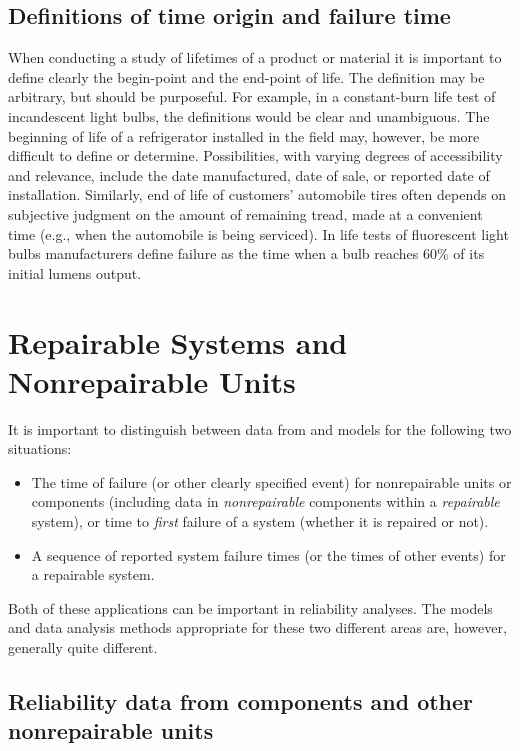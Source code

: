 \subsection{Definitions of time origin and failure time}
\label{section:def.of.time.origin}
When conducting a study of lifetimes of a product or material it is
important to define clearly the begin-point and the end-point of life.
The definition may be arbitrary, but should be purposeful.  For
example, in a constant-burn life test of incandescent light bulbs, the
definitions would be clear and unambiguous. The beginning of life of a
refrigerator installed in the field may, however, be more difficult to
define or determine. Possibilities, with varying degrees of
accessibility and relevance, include the date manufactured, date of sale, or
reported date of installation.  Similarly, end of life of customers'
automobile tires often depends on subjective judgment on the amount of
remaining tread, made at a convenient time (e.g., when the automobile
is being serviced).  In life tests of fluorescent light bulbs
manufacturers define failure as the time when a bulb reaches $60\%$ of
its initial lumens output.

\section{Repairable Systems and Nonrepairable Units}
\label{section:repair.nonrepair}
It is important to distinguish between data from and models for
the following two situations:
\begin{itemize} 
\item
The time of failure (or other clearly specified event) for
nonrepairable units or components (including data in {\em
nonrepairable} components within a {\em repairable} system),
or time to {\em first} failure of a system (whether it is
repaired or not).
\item
A sequence of reported system failure times
(or the times of other events) for a repairable system.
\end{itemize}
Both of these applications can be important in reliability analyses.
The models and data analysis methods appropriate for these two
different areas are, however, generally quite different.

\subsection{Reliability data from 
components and other nonrepairable units}
\label{section:rel.data.from.nonrepair}

